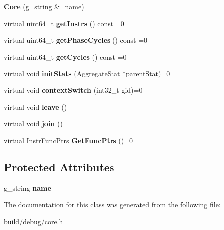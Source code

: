 \begin{DoxyCompactItemize}
\item 
\hypertarget{classCore_ab977c051264daa466362c38f20bf7512}{{\bfseries Core} (g\-\_\-string \&\-\_\-name)}\label{classCore_ab977c051264daa466362c38f20bf7512}

\item 
\hypertarget{classCore_ac3fa041719ceb8c63958eb834eb67c99}{virtual uint64\-\_\-t {\bfseries get\-Instrs} () const =0}\label{classCore_ac3fa041719ceb8c63958eb834eb67c99}

\item 
\hypertarget{classCore_ac47f10ddfe0e591620113e0fe2ae2351}{virtual uint64\-\_\-t {\bfseries get\-Phase\-Cycles} () const =0}\label{classCore_ac47f10ddfe0e591620113e0fe2ae2351}

\item 
\hypertarget{classCore_ac2e4ef43c71b1e50a3cc89d1ec8c58aa}{virtual uint64\-\_\-t {\bfseries get\-Cycles} () const =0}\label{classCore_ac2e4ef43c71b1e50a3cc89d1ec8c58aa}

\item 
\hypertarget{classCore_a093c22041db0e412cf0c84c862676629}{virtual void {\bfseries init\-Stats} (\hyperlink{classAggregateStat}{Aggregate\-Stat} $\ast$parent\-Stat)=0}\label{classCore_a093c22041db0e412cf0c84c862676629}

\item 
\hypertarget{classCore_a9e0d130d0746bed33473dcd8cbc397bb}{virtual void {\bfseries context\-Switch} (int32\-\_\-t gid)=0}\label{classCore_a9e0d130d0746bed33473dcd8cbc397bb}

\item 
\hypertarget{classCore_abf2a30c06a88df1382a7d0cf0da08d2c}{virtual void {\bfseries leave} ()}\label{classCore_abf2a30c06a88df1382a7d0cf0da08d2c}

\item 
\hypertarget{classCore_a2e692b0643767e9abf6b94794cd0c388}{virtual void {\bfseries join} ()}\label{classCore_a2e692b0643767e9abf6b94794cd0c388}

\item 
\hypertarget{classCore_acf1335c8e2215e3e1ff91aa71359f4ec}{virtual \hyperlink{structInstrFuncPtrs}{Instr\-Func\-Ptrs} {\bfseries Get\-Func\-Ptrs} ()=0}\label{classCore_acf1335c8e2215e3e1ff91aa71359f4ec}

\end{DoxyCompactItemize}
\subsection*{Protected Attributes}
\begin{DoxyCompactItemize}
\item 
\hypertarget{classCore_af9a530c13a24af172b2430b9b53ee7e3}{g\-\_\-string {\bfseries name}}\label{classCore_af9a530c13a24af172b2430b9b53ee7e3}

\end{DoxyCompactItemize}


The documentation for this class was generated from the following file\-:\begin{DoxyCompactItemize}
\item 
build/debug/core.\-h\end{DoxyCompactItemize}
